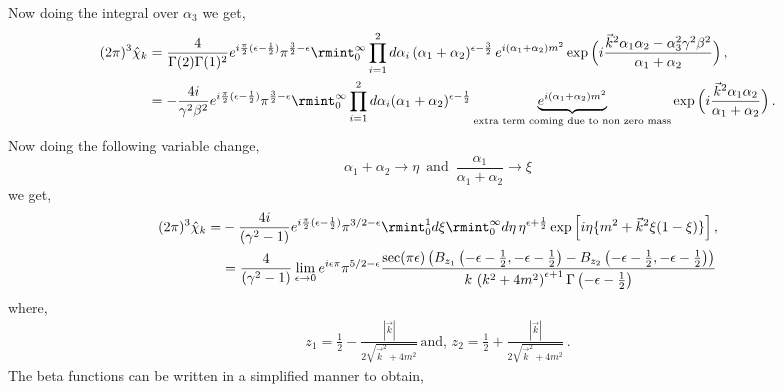 Now doing the integral over $\alpha_3$ we get,
\begin{align}
    \begin{split}
      (2\pi)^3  \hat\chi_{k}&= \frac{4}{\Gamma(2)\Gamma(1)^2}e^{i\frac{\pi}{2}(\epsilon-\frac{1}{2})}\pi^{\frac{3}{2}-\epsilon}\rmint_0^\infty  \prod_{i=1}^2 d\alpha_i \,(\alpha_1+\alpha_2)^{\epsilon-\frac{3}{2}}\,e^{i(\alpha_1+\alpha_2)m^2}\exp\Big(i\frac{\vec{k}^2\alpha_1\alpha_2-\alpha_3^2 \gamma^2\beta^2}{\alpha_1+\alpha_2}\Big)\,,\\ &
        =-\frac{4i}{\gamma^2\beta^2}e^{i\frac{\pi}{2}(\epsilon-\frac{1}{2})}\pi^{\frac{3}{2}-\epsilon}\rmint_0^\infty  \prod_{i=1}^2 d\alpha_i (\alpha_1+\alpha_2)^{\epsilon-\frac{1}{2}}\underbrace{e^{i(\alpha_1+\alpha_2)m^2}}_{\textrm{extra term coming due to non zero mass}}\exp\Big(i\frac{\vec{k}^2\alpha_1\alpha_2}{\alpha_1+\alpha_2}\Big)\,.
    \end{split}
\end{align}
Now doing the following variable change,
$$\alpha_1+\alpha_2\to \eta\,\,\,\textrm{and}\,\,\, \frac{\alpha_1}{\alpha_1+\alpha_2}\to \xi$$ we get,
\begin{align}
    \begin{split}
     (2\pi)^3   \hat\chi_{k}=&-\frac{4i}{(\gamma^2-1)} e^{i\frac{\pi}{2}(\epsilon-\frac{1}{2})}\pi^{3/2-\epsilon}\rmint_0^1 d\xi \rmint_0^\infty d\eta \,\eta^{\epsilon+\frac{1}{2}}\exp\Big[i\eta\{m^2+\vec{k}^2\xi(1-\xi)\}\Big]\,,\\ &
        =\frac{4}{(\gamma^2-1)}\lim_{\epsilon\to 0}e^{i\epsilon\pi}\pi^{5/2-\epsilon}\frac{    \sec (\pi  \epsilon ) \left(B_{z_1}\left(-\epsilon -\frac{1}{2},-\epsilon -\frac{1}{2}\right)-B_{z_2}\left(-\epsilon -\frac{1}{2},-\epsilon -\frac{1}{2}\right)\right)}{k\,\left(k^2+4 m^2\right)^{\epsilon +1}  \Gamma \left(-\epsilon -\frac{1}{2}\right)}\label{B.12}
    \end{split}
\end{align}
where,
\begin{align}
   z_1= \frac{1}{2}-\frac{|\vec{k}|}{2 \sqrt{\vec{k}^2+4 m^2}} \,\textrm{and,}\,\, z_2=\frac{1}{2}+\frac{|\vec{k}|}{2 \sqrt{\vec{k}^2+4 m^2}}\,.
\end{align}
The beta functions can be written in a simplified manner to obtain,
